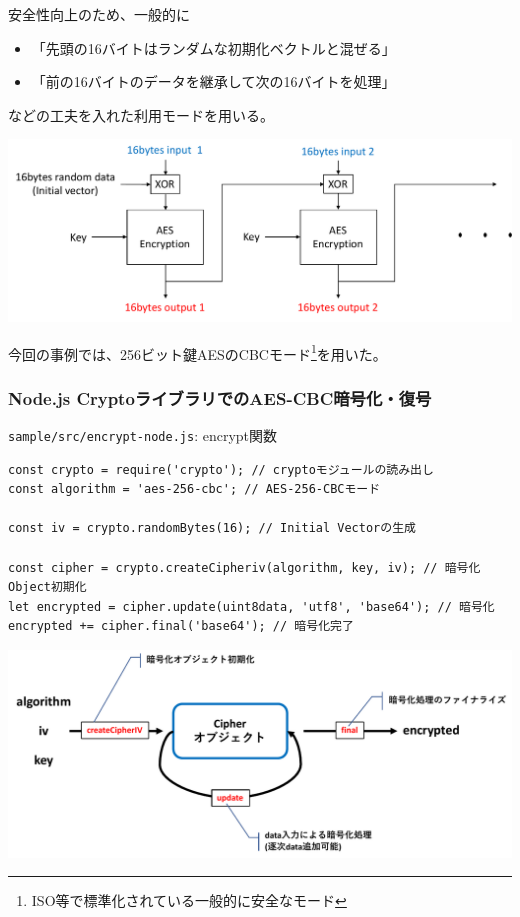 \documentclass[12pt,dvipdfmx]{beamer}
\begin{document}
\begin{frame}
安全性向上のため、一般的に
\begin{itemize}
 \item 「先頭の16バイトはランダムな初期化ベクトルと混ぜる」
 \item 「前の16バイトのデータを継承して次の16バイトを処理」
\end{itemize}
などの工夫を入れた利用モードを用いる。

\begin{center}
\includegraphics[width=0.8\linewidth]{Figs/cbc_mode.pdf}
\end{center}

\vspace{2ex}
今回の事例では、256ビット鍵AESのCBCモード\footnote[frame]{ISO等で標準化されている一般的に安全なモード}を用いた。
\end{frame}


\begin{frame}[fragile]
\frametitle{Node.js CryptoライブラリでのAES-CBC暗号化・復号}
\begin{block}{\small \texttt{sample/src/encrypt-node.js}: encrypt関数}
\scriptsize
\begin{verbatim}
const crypto = require('crypto'); // cryptoモジュールの読み出し
const algorithm = 'aes-256-cbc'; // AES-256-CBCモード

const iv = crypto.randomBytes(16); // Initial Vectorの生成

const cipher = crypto.createCipheriv(algorithm, key, iv); // 暗号化Object初期化
let encrypted = cipher.update(uint8data, 'utf8', 'base64'); // 暗号化
encrypted += cipher.final('base64'); // 暗号化完了
\end{verbatim}
\end{block}

\begin{center}
\includegraphics[width=0.8\linewidth]{Figs/node_aes_e.pdf}
\end{center}
\end{frame}
\end{document}
